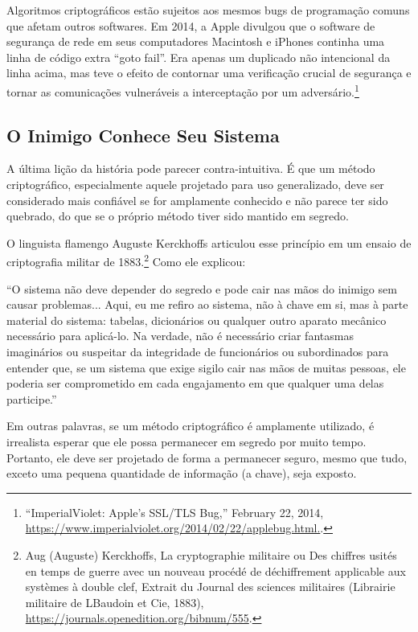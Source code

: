 \documentclass{book}
\begin{document}
Algoritmos criptográficos estão sujeitos aos mesmos bugs de programação comuns que afetam outros softwares. Em 2014, a Apple divulgou que o software de segurança de rede em seus computadores Macintosh e iPhones continha uma linha de código extra ``goto fail''. Era apenas um duplicado não intencional da linha acima, mas teve o efeito de contornar uma verificação crucial de segurança e tornar as comunicações vulneráveis a interceptação por um adversário.\footnote{“ImperialViolet: Apple’s SSL/TLS Bug,” February 22, 2014, \url{https://www.imperialviolet.org/2014/02/22/applebug.html.}.}


\subsection{O Inimigo Conhece Seu Sistema}
\label{segredos:inimigo}

A última lição da história pode parecer contra-intuitiva. É que um método criptográfico, especialmente aquele projetado para uso generalizado, deve ser considerado mais confiável se for amplamente conhecido e não parece ter sido quebrado, do que se o próprio método tiver sido mantido em segredo.

O linguista flamengo Auguste Kerckhoffs articulou esse princípio em um ensaio de criptografia militar de 1883.\footnote{Aug (Auguste) Kerckhoffs, La cryptographie militaire ou Des chiffres usités en temps de guerre avec un nouveau procédé de déchiffrement applicable aux systèmes à double clef, Extrait du Journal des sciences militaires (Librairie militaire de LBaudoin et Cie, 1883), \url{https://journals.openedition.org/bibnum/555}.} Como ele explicou:

%
``O sistema não deve depender do segredo e pode cair nas mãos do inimigo sem causar problemas... Aqui, eu me refiro ao sistema, não à chave em si, mas à parte material do sistema: tabelas, dicionários ou qualquer outro aparato mecânico necessário para aplicá-lo. Na verdade, não é necessário criar fantasmas imaginários ou suspeitar da integridade de funcionários ou subordinados para entender que, se um sistema que exige sigilo cair nas mãos de muitas pessoas, ele poderia ser comprometido em cada engajamento em que qualquer uma delas participe.''
%

Em outras palavras, se um método criptográfico é amplamente utilizado, é irrealista esperar que ele possa permanecer em segredo por muito tempo. Portanto, ele deve ser projetado de forma a permanecer seguro, mesmo que tudo, exceto uma pequena quantidade de informação (a chave), seja exposto.
\end{document}
